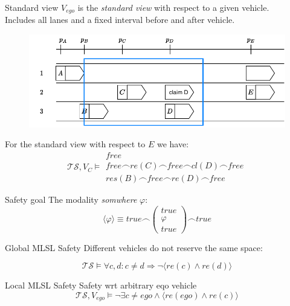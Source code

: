 \documentclass[xcolor=table]{beamer}
\begin{document}
\begin{frame}{Standard view}
$V_{ego}$ is the \textit{standard view} with respect to a given vehicle.\\
\bigskip
Includes all lanes and a fixed interval before and after vehicle.
\pause
\begin{figure}[h]
	\centering
	\includegraphics[width=0.7 \textwidth]{../figs/MLSL_standard_view}
\end{figure}
\pause
For the standard view with respect to $E$ we have:
\begin{equation*}
\mathcal{TS}, V_{C} \models \begin{matrix}free \\
											free \frown re(C) \frown free \frown cl(D) \frown free \\
											res(B) \frown free \frown re(D) \frown free \end{matrix}
\end{equation*}
\end{frame}

\begin{frame}{Safety goal}
The modality \textit{somwhere} $\varphi$:
\begin{equation*}
\langle \varphi \rangle \equiv true \frown \begin{pmatrix}true \\ \varphi \\ true\end{pmatrix} \frown true
\end{equation*}
\pause
\begin{block}{Global MLSL Safety}
Different vehicles do not reserve the same space:

\begin{equation*}
\mathcal{TS} \models \forall c, d: c \ne d \Rightarrow \neg \langle re(c) \land re(d)\rangle
\end{equation*}
\end{block}
\pause

\begin{block}{Local MLSL Safety}
Safety wrt arbitrary eqo vehicle
\begin{equation*}\label{eq:safety_goal}
\mathcal{TS}, V_{ego} \models \neg \exists c \neq ego \land \langle re(ego) \land re(c)\rangle
\end{equation*}
\end{block}
\end{frame}
\end{document}
